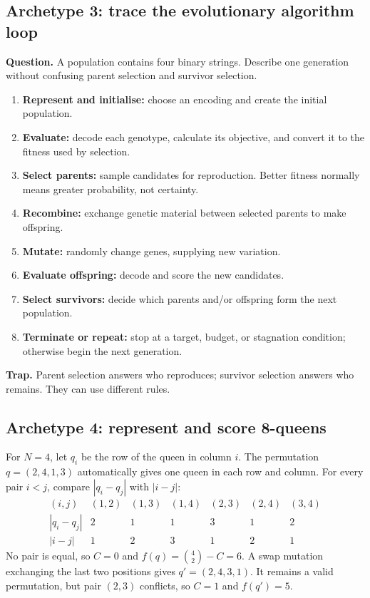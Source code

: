 \documentclass[11pt,a4paper]{article}
\begin{document}
\subsection{Archetype 3: trace the evolutionary algorithm loop}
\textbf{Question.} A population contains four binary strings. Describe one generation without confusing parent selection and survivor selection.
\begin{enumerate}
\item \textbf{Represent and initialise:} choose an encoding and create the initial population.
\item \textbf{Evaluate:} decode each genotype, calculate its objective, and convert it to the fitness used by selection.
\item \textbf{Select parents:} sample candidates for reproduction. Better fitness normally means greater probability, not certainty.
\item \textbf{Recombine:} exchange genetic material between selected parents to make offspring.
\item \textbf{Mutate:} randomly change genes, supplying new variation.
\item \textbf{Evaluate offspring:} decode and score the new candidates.
\item \textbf{Select survivors:} decide which parents and/or offspring form the next population.
\item \textbf{Terminate or repeat:} stop at a target, budget, or stagnation condition; otherwise begin the next generation.
\end{enumerate}
\textbf{Trap.} Parent selection answers who reproduces; survivor selection answers who remains. They can use different rules.

\subsection{Archetype 4: represent and score 8-queens}
For $N=4$, let $q_i$ be the row of the queen in column $i$. The permutation $q=(2,4,1,3)$ automatically gives one queen in each row and column. For every pair $i<j$, compare $|q_i-q_j|$ with $|i-j|$:
\[
\begin{array}{c|cccccc}
(i,j)&(1,2)&(1,3)&(1,4)&(2,3)&(2,4)&(3,4)\\
\hline
|q_i-q_j|&2&1&1&3&1&2\\
|i-j|&1&2&3&1&2&1
\end{array}
\]
No pair is equal, so $C=0$ and $f(q)=\binom42-C=6$. A swap mutation exchanging the last two positions gives $q'=(2,4,3,1)$. It remains a valid permutation, but pair $(2,3)$ conflicts, so $C=1$ and $f(q')=5$.
\end{document}

